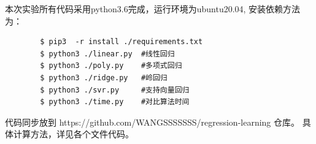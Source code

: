 \documentclass{ctexart}
\begin{document}
本次实验所有代码采用python3.6完成，运行环境为ubuntu20.04, 安装依赖方法为：

\begin{commandline}
	\begin{verbatim}
		$ pip3  -r install ./requirements.txt
		$ python3 ./linear.py  #线性回归
		$ python3 ./poly.py    #多项式回归
		$ python3 ./ridge.py   #岭回归
		$ python3 ./svr.py     #支持向量回归
		$ python3 ./time.py    #对比算法时间

	\end{verbatim}
\end{commandline}


\begin{warn}[Notice:]
  代码同步放到 https://github.com/WANGSSSSSSS/regression-learning 仓库。
  具体计算方法，详见各个文件代码。
\end{warn}

\end{document}
